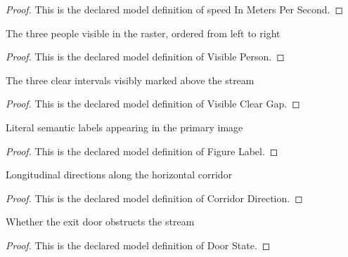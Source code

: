 \begin{proof}
  This is the declared model definition of speed In Meters Per Second.
\end{proof}
\begin{definition}
  \label{def:physics:phyx-mini-0728:phyxminiproblems-problemphyxmini0728-visibleperson}
  The three people visible in the raster, ordered from left to right
\end{definition}
\begin{proof}
  This is the declared model definition of Visible Person.
\end{proof}
\begin{definition}
  \label{def:physics:phyx-mini-0728:phyxminiproblems-problemphyxmini0728-visiblecleargap}
  The three clear intervals visibly marked above the stream
\end{definition}
\begin{proof}
  This is the declared model definition of Visible Clear Gap.
\end{proof}
\begin{definition}
  \label{def:physics:phyx-mini-0728:phyxminiproblems-problemphyxmini0728-figurelabel}
  Literal semantic labels appearing in the primary image
\end{definition}
\begin{proof}
  This is the declared model definition of Figure Label.
\end{proof}
\begin{definition}
  \label{def:physics:phyx-mini-0728:phyxminiproblems-problemphyxmini0728-corridordirection}
  Longitudinal directions along the horizontal corridor
\end{definition}
\begin{proof}
  This is the declared model definition of Corridor Direction.
\end{proof}
\begin{definition}
  \label{def:physics:phyx-mini-0728:phyxminiproblems-problemphyxmini0728-doorstate}
  Whether the exit door obstructs the stream
\end{definition}
\begin{proof}
  This is the declared model definition of Door State.
\end{proof}
